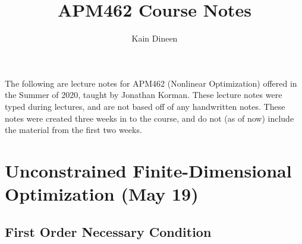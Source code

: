 \documentclass[11pt]{article}
\title{APM462 Course Notes}
\author{Kain Dineen}
\begin{document}
\maketitle

The following are lecture notes for APM462 (Nonlinear Optimization) offered in the Summer of 2020, taught by Jonathan Korman. These lecture notes were typed during lectures, and are not based off of any handwritten notes. These notes were created three weeks in to the course, and do not (as of now) include the material from the first two weeks.

\tableofcontents

\newpage
\section{Unconstrained Finite-Dimensional Optimization (May 19)}

\subsection{First Order Necessary Condition}
\end{document}
